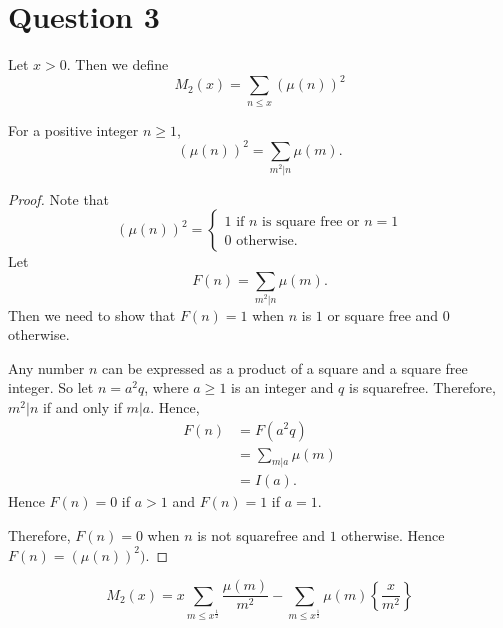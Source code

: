 \documentclass{unswmaths}
\begin{document}
\section*{Question 3}
\begin{definition}
    Let $x > 0$. Then we define
    \begin{equation*}
        M_2(x) = \sum_{n\leq x} (\mu(n))^2
    \end{equation*}
\end{definition}
\begin{lemma}
\label{M2Alt}
    For a positive integer $n \geq 1$,
    \begin{equation*}
        (\mu(n))^2 = \sum_{m^2|n} \mu(m).
    \end{equation*}
\end{lemma}
\begin{proof}
    Note that
    \begin{equation*}
        (\mu(n))^2 = \begin{cases}
            1\text{ if }n\text{ is square free or }n = 1\\
            0\text{ otherwise.}
        \end{cases}
    \end{equation*}
    Let 
    \begin{equation*}
        F(n) = \sum_{m^2|n} \mu(m).
    \end{equation*}
    Then we need to show that $F(n) = 1$ when $n$ is $1$ or square free 
    and $0$ otherwise.
    
    Any number $n$ can be expressed as a product of a square and a square
    free integer. So let $n = a^2q$, where $a \geq 1$ is an integer 
    and $q$ is squarefree. Therefore,  $m^2|n$ if and only if $m|a$. Hence,
    \begin{align*}
        F(n) &= F(a^2q)\\
             &= \sum_{m|a}\mu(m)\\
             &= I(a).
    \end{align*}
    Hence $F(n) = 0$ if $a > 1$ and $F(n) = 1$ if $a = 1$.
    
    Therefore, $F(n) = 0$ when $n$ is not squarefree and $1$ otherwise.
    Hence $F(n) = (\mu(n))^2)$.
\end{proof}
\begin{lemma}
    \begin{equation*}
        M_2(x) = x\sum_{m\leq x^\frac{1}{2}} \frac{\mu(m)}{m^2}-\sum_{m\leq x^\frac{1}{2}}\mu(m)\left\{\frac{x}{m^2}\right\}
    \end{equation*}
\end{lemma}
\end{document}
